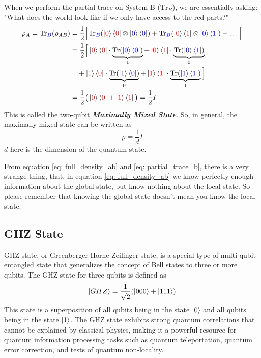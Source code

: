 \documentclass[11pt, letterpaper]{article}
\begin{document}
When we perform the partial trace on System B ($\text{Tr}_B$), we are essentially asking: "What does the world look like if we only have access to the red parts?"
\begin{equation}
\begin{aligned}
\rho_A = \text{Tr}_{\color{blue} B}(\rho_{AB}) &= \frac{1}{2} \Big[
\text{Tr}_{\color{blue} B}(\ket{{\color{red} 0}}\bra{{\color{red} 0}} \otimes \ket{{\color{blue} 0}}\bra{{\color{blue} 0}}) +
\text{Tr}_{\color{blue} B}(\ket{{\color{red} 0}}\bra{{\color{red} 1}} \otimes \ket{{\color{blue} 0}}\bra{{\color{blue} 1}}) + \dots \Big] \\
&= \frac{1}{2} \Big[
\ket{{\color{red} 0}}\bra{{\color{red} 0}} \cdot \underbrace{\text{Tr}(\ket{{\color{blue} 0}}\bra{{\color{blue} 0}})}_{1} +
\ket{{\color{red} 0}}\bra{{\color{red} 1}} \cdot \underbrace{\text{Tr}(\ket{{\color{blue} 0}}\bra{{\color{blue} 1}})}_{0} \\
&\quad + \ket{{\color{red} 1}}\bra{{\color{red} 0}} \cdot \underbrace{\text{Tr}(\ket{{\color{blue} 1}}\bra{{\color{blue} 0}})}_{0} +
\ket{{\color{red} 1}}\bra{{\color{red} 1}} \cdot \underbrace{\text{Tr}(\ket{{\color{blue} 1}}\bra{{\color{blue} 1}})}_{1}
\Big] \\
&= \frac{1}{2} \big( \ket{{\color{red} 0}}\bra{{\color{red} 0}} + \ket{{\color{red} 1}}\bra{{\color{red} 1}} \big) = \frac{1}{2}I
\end{aligned}
\label{eq: partial_trace_b}
\end{equation}
This is called the two-qubit \textbf{\textit{Maximally Mixed State}}. So, in general, the maximally mixed state can be written as
\begin{equation}
  \rho = \frac{1}{d}I
\end{equation}
$d$ here is the dimension of the quantum state.

From equation \ref{eq: full_density_ab} and \ref{eq: partial_trace_b}, there is a very strange thing, that, in equation \ref{eq: full_density_ab} we know perfectly enough information about the global state, but know nothing about the local state. So please remember that knowing the global state doesn't mean you know the local state.

\subsection{GHZ State}
GHZ state, or Greenberger-Horne-Zeilinger state, is a special type of multi-qubit entangled state that generalizes the concept of Bell states to three or more qubits. The GHZ state for three qubits is defined as
\begin{equation}
  \ket{GHZ} = \frac{1}{\sqrt{2}}(\ket{000} + \ket{111})
\end{equation}
This state is a superposition of all qubits being in the state $\ket{0}$ and all qubits being in the state $\ket{1}$. The GHZ state exhibits strong quantum correlations that cannot be explained by classical physics, making it a powerful resource for quantum information processing tasks such as quantum teleportation, quantum error correction, and tests of quantum non-locality.
\end{document}
